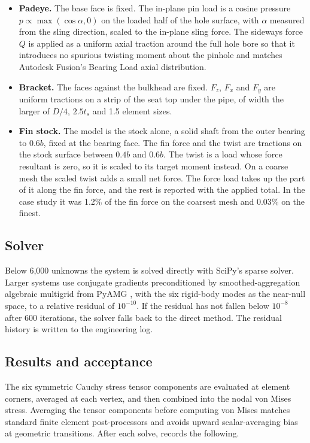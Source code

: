 \begin{itemize}
    \item \textbf{Padeye.} The base face is fixed. The in-plane pin load is a
    cosine pressure $p \propto \max(\cos\alpha, 0)$ on the loaded half of the
    hole surface, with $\alpha$ measured from the sling direction, scaled to
    the in-plane sling force. The sideways force $Q$ is applied as a uniform
    axial traction around the full hole bore so that it introduces no spurious
    twisting moment about the pinhole and matches Autodesk Fusion's Bearing
    Load axial distribution.
    \item \textbf{Bracket.} The faces against the bulkhead are fixed. $F_z$,
    $F_x$ and $F_y$ are uniform tractions on a strip of the seat top under the
    pipe, of width the larger of $D/4$, $2.5t_s$ and 1.5 element sizes.
    \item \textbf{Fin stock.} The model is the stock alone, a solid shaft from
    the outer bearing to $0.6b$, fixed at the bearing face. The fin force and
    the twist are tractions on the stock surface between $0.4b$ and $0.6b$.
    The twist is a load whose force resultant is zero, so it is scaled to its
    target moment instead. On a coarse mesh the scaled twist adds a small net
    force. The force load takes up the part of it along the fin force, and the
    rest is reported with the applied total. In the case study it was 1.2\%
    of the fin force on the coarsest mesh and 0.03\% on the finest.
\end{itemize}

\subsection{Solver}

Below 6,000 unknowns the system is solved directly with SciPy's sparse
solver. Larger systems use conjugate gradients preconditioned by
smoothed-aggregation algebraic multigrid from PyAMG
\cite{pyamg2023,vanek1996}, with the six rigid-body modes as the near-null
space, to a relative residual of $10^{-10}$. If the residual has not fallen
below $10^{-8}$ after 600 iterations, the solver falls back to the direct
method. The residual history is written to the engineering log.

\subsection{Results and acceptance}

The six symmetric Cauchy stress tensor components are evaluated at element
corners, averaged at each vertex, and then combined into the nodal von Mises
stress. Averaging the tensor components before computing von Mises matches
standard finite element post-processors and avoids upward scalar-averaging bias
at geometric transitions. After each solve, \NEMO{} records the following.

